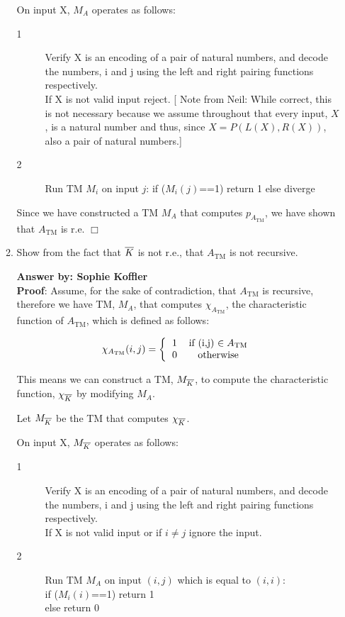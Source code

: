 \documentclass[12pt]{article}
\begin{document}
\begin{enumerate}
\begin{enumerate}
         On input X, $M_{A}$ operates as follows:
         \begin{description}
         	\item[1] Verify X is an encoding of a pair of natural numbers, and decode the numbers, i and j using the left and right pairing functions respectively. 
         	\\If X is not valid input reject.  [{\color{blue} Note from Neil: While correct, this is not
                necessary because we assume throughout that every input, $X$, is a natural number
                and thus, since $X = P(L(X),R(X))$, also a pair of natural numbers.}]
         	\item[2] Run TM $M_{i}$ on input $j$:
			         	if ($M_{i}(j)$==1) return 1
			         	else diverge
         \end{description}
        Since we have constructed a TM $M_{A}$ that computes $p_{A_{\text{TM}}}$, we have shown that $A_{\text{TM}}$ is r.e. $\Box$ 
         
   \item Show from the fact that $\overline{K}$ is not r.e., that $A_{\text{TM}}$ is not recursive.  
   
{\bf Answer by: Sophie Koffler} \\

     \textbf{Proof}: Assume, for the sake of contradiction, that $A_{\text{TM}}$ is recursive, therefore we have TM, $M_{A}$, that
     computes $\chi_{A_{\text{TM}}}$, the characteristic function of $A_{\text{TM}}$, which is defined as follows: 
      \begin{center}	 
       	\[ \chi_{A_{\text{TM}}}(i,j) = 
       	\left \{
       	\begin{tabular}{cc}
       	1 & if (i,j) $\in A_{\text{TM}}$  \\
       	0 & otherwise \\
       	\end{tabular}
       	\right.
       	\]
       \end{center}
       
       This means we can construct a TM, $M_{\overline{K}}$, to compute the characteristic function, $\chi_{\overline{K}}$ by modifying $M_{A}$.
       
       Let $M_{\overline{K}}$ be the TM that computes $\chi_{\overline{K}}$.
       
       On input X, $M_{\overline{K}}$ operates as follows:
       \begin{description}
       	\item[1] Verify X is an encoding of a pair of natural numbers, and decode the numbers, i and j using the left and right pairing functions respectively. 
       	\\If X is not valid input or if $i \neq j$ ignore the input.
       	\item[2] Run TM $M_A$ on input $(i,j)$ which is equal to $(i,i)$:
       	\\if ($M_{i}(i)$==1) return 1
       	\\else return 0
       \end{description}
       

\end{enumerate}
\end{enumerate}
\end{document}
